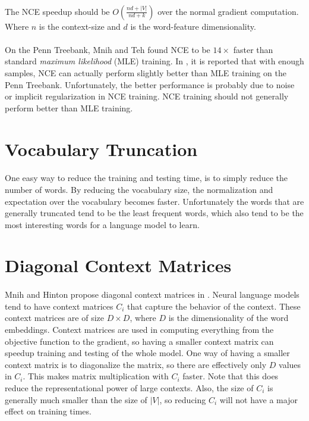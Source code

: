 \paragraph{}
The NCE speedup should be $O \left(\frac{nd + |V|} {nd+ k} \right)$ over the normal gradient computation. Where $n$ is the context-size and $d$ is the word-feature dimensionality.
\paragraph{}
On the Penn Treebank, Mnih and Teh found NCE to be $14\times$ faster than standard \emph{maximum likelihood} (MLE)  training. In \cite{MnihTeh2012}, it is reported that with enough samples, NCE can actually perform slightly better than MLE training on the Penn Treebank. Unfortunately, the better performance is probably due to noise or implicit regularization in NCE training. NCE training should not generally perform better than MLE training.


\section{Vocabulary Truncation}
\paragraph{}
One easy way to reduce the training and testing time, is to simply reduce the number of words. By reducing the vocabulary size, the normalization and expectation over the vocabulary becomes faster. Unfortunately the words that are generally truncated tend to be the least frequent words, which also tend to be the most interesting words for a language model to learn. 
\section{Diagonal Context Matrices}
\paragraph{}
Mnih and Hinton propose diagonal context matrices in \cite{MnihHinton2009}. Neural language models tend to have context matrices $C_i$ that capture the behavior of the context. These context matrices are of size $D \times D$, where $D$ is the dimensionality of the word embeddings. Context matrices are used in computing everything from the objective function to the gradient, so having a smaller context matrix can speedup training and testing of the whole model. One way of having a smaller context matrix is to diagonalize the matrix, so there are effectively only $D$ values in $C_i$. This makes matrix multiplication with $C_i$ faster. Note that this does reduce the representational power of large contexts. Also, the size of $C_i$ is generally much smaller than the size of $|V|$, so reducing $C_i$ will not have a major effect on training times.

